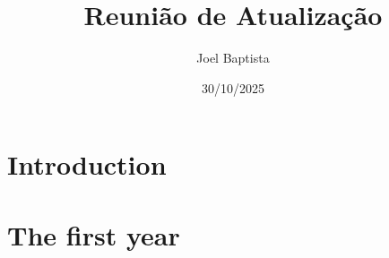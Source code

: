 \documentclass[10pt,xcolor={dvipsnames}]{beamer}
\title[]
{\large Reunião de Atualização}
\subtitle{}
\author[Joel Baptista] %
{Joel Baptista}
\institute[VFU] %
{
  \inst{1}%
  Department of Mechanical Engineering\\
  University of Aveiro, Portugal
  \and
  \inst{2}%
  Institute of Electronics and Informatics Engineering of Aveiro\\
  University of Aveiro, Portugal

}
\date[2025/10/30] %
{30/10/2025}
\begin{document}
\frame{\titlepage}



\section{Introduction}
% 

\section{The first year}


\end{document}
